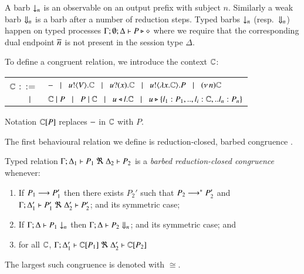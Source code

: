 \smallskip 

A barb $\downarrow_{n}$ is an observable on an output prefix with subject $n$.
Similarly a weak barb $\Downarrow_{n}$ is a barb after a number of reduction steps.
Typed barbs $\downarrow_{n}$ (resp.\ $\Downarrow_{n}$)
happen on typed processes $\Gamma; \emptyset; \Delta \vdash P \triangleright \diamond$
where we require that the corresponding dual endpoint $\overline{n}$ is not present
in the session type $\Delta$.

To define a congruent relation, we introduce the context ${\Bbb C}$:\\  

\noi	\begin{tabular}{rl}
	${\Bbb C}$ $::=$ & $- \;\;\;|\;\;\; u ! \langle V \rangle . {\Bbb C} \;\;\;|\;\;\; u ? (x) . {\Bbb C}
\;\;\;|\;\;\; u ! \langle \lambda x.{\Bbb C} \rangle . P
\;\;\;|\;\;\; (\nu\, n) {\Bbb C}$\\ 
             $\;\;\;|\;\;\;$ & ${\Bbb C} \;|\; P \;\;\;|\;\;\; P \;|\; {\Bbb C} 
\;\;\;|\;\;\; u \triangleleft l . {\Bbb C} \;\;\;|\;\;\; u \triangleright \{l_1:P_1,..,l_i:{\Bbb C},..l_n:P_n\}$\\
	\end{tabular}

\noi Notation ${\Bbb C}[P]$ replaces $-$ in ${\Bbb C}$ with $P$.

The first behavioural relation we define is reduction-closed, barbed congruence \cite{HondaKYoshida95}. 

\begin{definition}\rm
\label{def:rc}
	Typed relation
	$\horel{\Gamma}{\Delta_1}{P_1}{\ \Re\ }{\Delta_2}{P_2}$
	is a {\em barbed reduction-closed congruence} whenever:
	\begin{enumerate}
	\item	If $P_1 \longrightarrow P_1'$ then there exists $P_2'$ such that $P_2 \longrightarrow^* P_2'$ and
	$\horel{\Gamma}{\Delta_1'}{P_1'}{\ \Re\ }{\Delta_2'}{P_2'}$; 
and its symmetric case;

			\item	If $\Gamma;\Delta \vdash P_1 \downarrow_{n}$ then $\Gamma;\Delta \vdash P_2 \Downarrow_{n}$; and its symmetric case; and 


		\item	for all ${\Bbb C}$, $\horel{\Gamma}{\Delta_1'}{\context{\C}{P_1}}{\ \Re\ }{\Delta_2'}{\context{\C}{P_2}}$
	\end{enumerate}
	The largest such congruence is denoted with $\cong$.
\end{definition}


